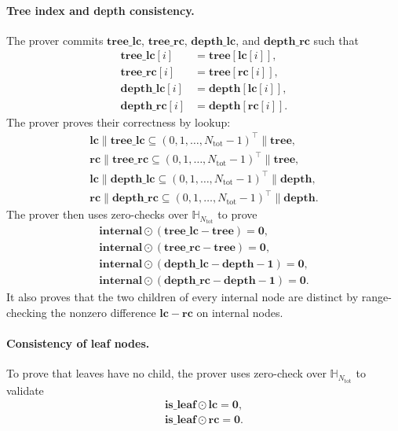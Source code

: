 \paragraph{Tree index and depth consistency.}
The prover commits $\mathbf{tree\_lc}$, $\mathbf{tree\_rc}$,
$\mathbf{depth\_lc}$, and $\mathbf{depth\_rc}$ such that
    \begin{align}
        \mathbf{tree\_lc}[i] &= \mathbf{tree}[\mathbf{lc}[i]], \\
        \mathbf{tree\_rc}[i] &= \mathbf{tree}[\mathbf{rc}[i]], \\
        \mathbf{depth\_lc}[i] &= \mathbf{depth}[\mathbf{lc}[i]], \\
        \mathbf{depth\_rc}[i] &= \mathbf{depth}[\mathbf{rc}[i]].
    \end{align}
The prover proves their correctness by lookup:
    \begin{align}
        \mathbf{lc}\| \mathbf{tree\_lc} \subseteq (0, 1, \dots, N_{\mathrm{tot}}-1)^\top \| \mathbf{tree},\\
        \mathbf{rc}\| \mathbf{tree\_rc} \subseteq (0, 1, \dots, N_{\mathrm{tot}}-1)^\top \| \mathbf{tree},\\
        \mathbf{lc}\| \mathbf{depth\_lc} \subseteq (0, 1, \dots, N_{\mathrm{tot}}-1)^\top \| \mathbf{depth},\\
        \mathbf{rc}\| \mathbf{depth\_rc} \subseteq (0, 1, \dots, N_{\mathrm{tot}}-1)^\top \| \mathbf{depth}.
    \end{align}
The prover then uses zero-checks over $\mathbb{H}_{N_{\mathrm{tot}}}$ to prove
    \begin{align}
        \mathbf{internal}\odot (\mathbf{tree\_lc}-\mathbf{tree}) = \mathbf{0}, \\
        \mathbf{internal}\odot (\mathbf{tree\_rc}-\mathbf{tree}) = \mathbf{0},\\
        \mathbf{internal}\odot (\mathbf{depth\_lc}-\mathbf{depth}-\mathbf{1}) = \mathbf{0},\\
        \mathbf{internal}\odot (\mathbf{depth\_rc}-\mathbf{depth}-\mathbf{1}) = \mathbf{0}.
    \end{align}
It also proves that the two children of every internal node are distinct by
range-checking the nonzero difference $\mathbf{lc}-\mathbf{rc}$ on internal
nodes.

\paragraph{Consistency of leaf nodes.}
To prove that leaves have no child, the prover uses zero-check over $\mathbb{H}_{N_{\mathrm{tot}}}$ to validate
    \begin{align}
        \mathbf{is\_leaf} \odot \mathbf{lc} = \mathbf{0}, \\
        \mathbf{is\_leaf} \odot \mathbf{rc} = \mathbf{0}.
    \end{align}

